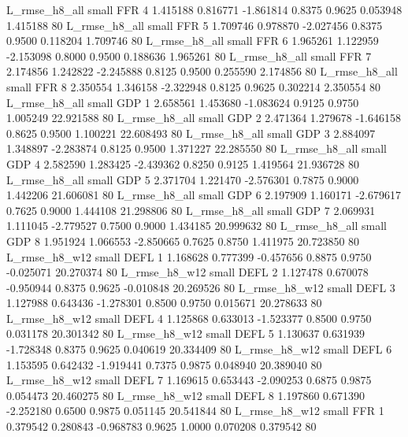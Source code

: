  L_rmse_h8_all      small      FFR                 4 1.415188 0.816771 -1.861814 0.8375 0.9625  0.053948    1.415188 80
 L_rmse_h8_all      small      FFR                 5 1.709746 0.978870 -2.027456 0.8375 0.9500  0.118204    1.709746 80
 L_rmse_h8_all      small      FFR                 6 1.965261 1.122959 -2.153098 0.8000 0.9500  0.188636    1.965261 80
 L_rmse_h8_all      small      FFR                 7 2.174856 1.242822 -2.245888 0.8125 0.9500  0.255590    2.174856 80
 L_rmse_h8_all      small      FFR                 8 2.350554 1.346158 -2.322948 0.8125 0.9625  0.302214    2.350554 80
 L_rmse_h8_all      small      GDP                 1 2.658561 1.453680 -1.083624 0.9125 0.9750  1.005249   22.921588 80
 L_rmse_h8_all      small      GDP                 2 2.471364 1.279678 -1.646158 0.8625 0.9500  1.100221   22.608493 80
 L_rmse_h8_all      small      GDP                 3 2.884097 1.348897 -2.283874 0.8125 0.9500  1.371227   22.285550 80
 L_rmse_h8_all      small      GDP                 4 2.582590 1.283425 -2.439362 0.8250 0.9125  1.419564   21.936728 80
 L_rmse_h8_all      small      GDP                 5 2.371704 1.221470 -2.576301 0.7875 0.9000  1.442206   21.606081 80
 L_rmse_h8_all      small      GDP                 6 2.197909 1.160171 -2.679617 0.7625 0.9000  1.444108   21.298806 80
 L_rmse_h8_all      small      GDP                 7 2.069931 1.111045 -2.779527 0.7500 0.9000  1.434185   20.999632 80
 L_rmse_h8_all      small      GDP                 8 1.951924 1.066553 -2.850665 0.7625 0.8750  1.411975   20.723850 80
 L_rmse_h8_w12      small     DEFL                 1 1.168628 0.777399 -0.457656 0.8875 0.9750 -0.025071   20.270374 80
 L_rmse_h8_w12      small     DEFL                 2 1.127478 0.670078 -0.950944 0.8375 0.9625 -0.010848   20.269526 80
 L_rmse_h8_w12      small     DEFL                 3 1.127988 0.643436 -1.278301 0.8500 0.9750  0.015671   20.278633 80
 L_rmse_h8_w12      small     DEFL                 4 1.125868 0.633013 -1.523377 0.8500 0.9750  0.031178   20.301342 80
 L_rmse_h8_w12      small     DEFL                 5 1.130637 0.631939 -1.728348 0.8375 0.9625  0.040619   20.334409 80
 L_rmse_h8_w12      small     DEFL                 6 1.153595 0.642432 -1.919441 0.7375 0.9875  0.048940   20.389040 80
 L_rmse_h8_w12      small     DEFL                 7 1.169615 0.653443 -2.090253 0.6875 0.9875  0.054473   20.460275 80
 L_rmse_h8_w12      small     DEFL                 8 1.197860 0.671390 -2.252180 0.6500 0.9875  0.051145   20.541844 80
 L_rmse_h8_w12      small      FFR                 1 0.379542 0.280843 -0.968783 0.9625 1.0000  0.070208    0.379542 80
